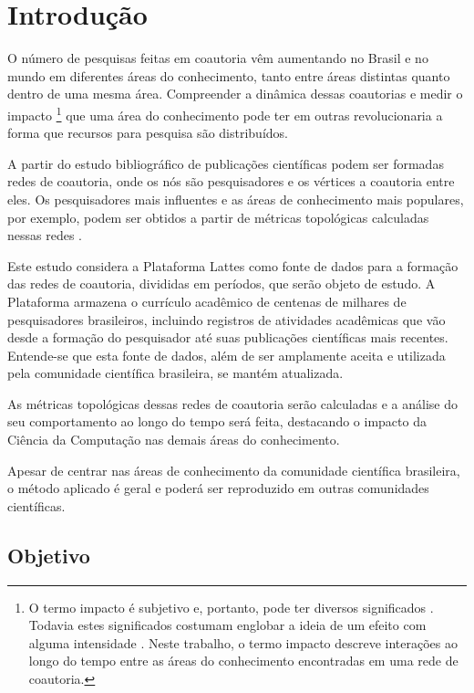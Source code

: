 \chapter[Introdução]{Introdução}

O número de pesquisas feitas em coautoria vêm aumentando no Brasil \cite{mena2014brazilian} e no mundo \cite{glanzel2003bibliometrics} em diferentes áreas do conhecimento, tanto entre áreas distintas quanto dentro de uma mesma área. Compreender a dinâmica dessas coautorias e medir o impacto \footnote{O termo impacto é subjetivo e, portanto, pode ter diversos significados \cite{roemer2015meaningful}. Todavia estes significados costumam englobar a ideia de um efeito com alguma intensidade \cite{roemer2015meaningful}. Neste trabalho, o termo impacto descreve interações ao longo do tempo entre as áreas do conhecimento encontradas em uma rede de coautoria.} que uma área do conhecimento pode ter em outras revolucionaria a forma que recursos para pesquisa são distribuídos.

A partir do estudo bibliográfico de publicações científicas podem ser formadas redes de coautoria, onde os nós são pesquisadores e os vértices a coautoria entre eles. Os pesquisadores mais influentes e as áreas de conhecimento mais populares, por exemplo, podem ser obtidos a partir de métricas topológicas calculadas nessas redes \cite{franceschet2011collaboration}.

Este estudo considera a Plataforma Lattes como fonte de dados para a formação das redes de coautoria, divididas em períodos, que serão objeto de estudo. A Plataforma armazena o currículo acadêmico de centenas de milhares de pesquisadores brasileiros, incluindo registros de atividades acadêmicas que vão desde a formação do pesquisador até suas publicações científicas mais recentes. Entende-se que esta fonte de dados, além de ser amplamente aceita e utilizada pela comunidade científica brasileira, se mantém atualizada.

As métricas topológicas dessas redes de coautoria serão calculadas e a análise do seu comportamento ao longo do tempo será feita, destacando o impacto da Ciência da Computação nas demais áreas do conhecimento.

Apesar de centrar nas áreas de conhecimento da comunidade científica brasileira, o método aplicado é geral e poderá ser reproduzido em outras comunidades científicas.

\section{Objetivo}

